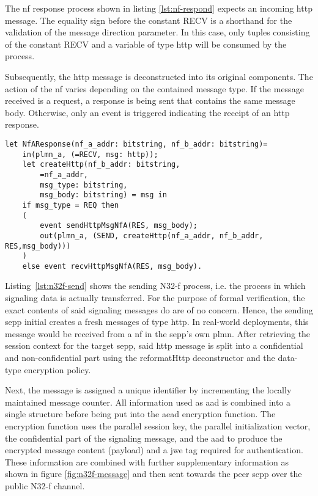 The \gls{nf} response process shown in listing \ref{lst:nf-respond} expects an incoming \gls{http} message.
The equality sign before the constant {\sffamily RECV} is a shorthand for the validation of the message direction parameter.
In this case, only tuples consisting of the constant {\sffamily RECV} and a variable of type {\sffamily http} will be consumed by the process.

Subsequently, the \gls{http} message is deconstructed into its original components.
The action of the \gls{nf} varies depending on the contained message type.
If the message received is a request, a response is being sent that contains the same message body.
Otherwise, only an event is triggered indicating the receipt of an \gls{http} response.

\begin{lstlisting}[caption={Definition of the responding NF process},label={lst:nf-respond},firstnumber=595]
let NfAResponse(nf_a_addr: bitstring, nf_b_addr: bitstring)=
    in(plmn_a, (=RECV, msg: http));
    let createHttp(nf_b_addr: bitstring,
        =nf_a_addr,
        msg_type: bitstring,
        msg_body: bitstring) = msg in
    if msg_type = REQ then
    (
        event sendHttpMsgNfA(RES, msg_body);
        out(plmn_a, (SEND, createHttp(nf_a_addr, nf_b_addr, RES,msg_body)))
    )
    else event recvHttpMsgNfA(RES, msg_body).
\end{lstlisting}

Listing~\ref{lst:n32f-send} shows the sending N32-f process, i.e. the process in which signaling data is actually transferred.
For the purpose of formal verification, the exact contents of said signaling messages do are of no concern.
Hence, the sending \gls{sepp} initial creates a fresh messages of type {\sffamily http}.
In real-world deployments, this message would be received from a \gls{nf} in the \gls{sepp}'s own \gls{plmn}.
After retrieving the session context for the target \gls{sepp}, said \gls{http} message is split into a confidential and non-confidential part using the {\sffamily reformatHttp} deconstructor and the data-type encryption policy.

Next, the message is assigned a unique identifier by incrementing the locally maintained message counter.
All information used as \gls{aad} is combined into a single structure before being put into the \gls{aead} encryption function.
The encryption function uses the parallel session key, the parallel initialization vector, the confidential part of the signaling message, and the \gls{aad} to produce the encrypted message content ({\sffamily payload}) and a \gls{jwe} tag required for authentication.
These information are combined with further supplementary information as shown in figure \ref{fig:n32f-message} and then sent towards the peer \gls{sepp} over the public N32-f channel.

